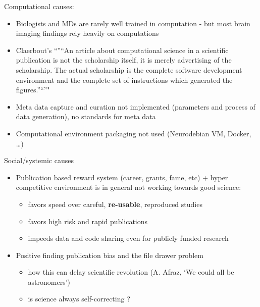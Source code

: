 \documentclass[ignorenonframetext,]{beamer}
\begin{document}
\begin{frame}

\begin{block}{Computational causes:}

\begin{itemize}[<+->]
\itemsep1pt\parskip0pt
\item
  Biologists and MDs are rarely well trained in computation - but most
  brain imaging findings rely heavily on computations
\item
  Claerbout's ``''``An article about computational science in a
  scientific publication is not the scholarship itself, it is merely
  advertising of the scholarship. The actual scholarship is the complete
  software development environment and the complete set of instructions
  which generated the figures.''``''"
\item
  Meta data capture and curation not implemented (parameters and process
  of data generation), no standards for meta data
\item
  Computational environment packaging not used (Neurodebian VM, Docker,
  \ldots{})
\end{itemize}

\end{block}

\end{frame}

\begin{frame}

\begin{block}{Social/systemic causes}

\begin{itemize}[<+->]
\itemsep1pt\parskip0pt
\item
  Publication based reward system (career, grants, fame, etc) + hyper
  competitive environment is in general not working towards good
  science:

  \begin{itemize}[<+->]
  \itemsep1pt\parskip0pt
  \item
    favors speed over careful, \textbf{re-usable}, reproduced studies
  \item
    favors high risk and rapid publications
  \item
    impeeds data and code sharing even for publicly funded research
  \end{itemize}
\item
  Positive finding publication bias and the file drawer problem

  \begin{itemize}[<+->]
  \itemsep1pt\parskip0pt
  \item
    how this can delay scientific revolution (A. Afraz, `We could all be
    astronomers')
  \item
    is science always self-correcting ?
  \end{itemize}
\end{itemize}

\end{block}

\end{frame}
\end{document}

